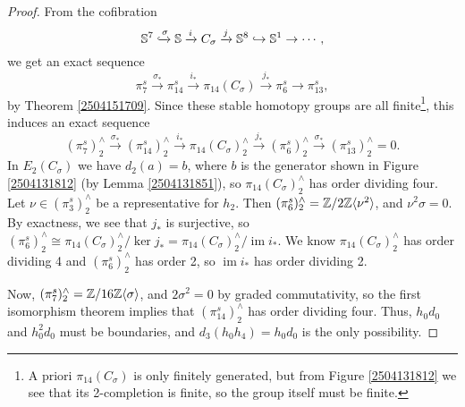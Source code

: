 \documentclass[11pt, titlepage]{article} %
\def\bb{\ensuremath\mathbb}
\def\inj{\ensuremath\hookrightarrow}
\def\xinj{\ensuremath\xhookrightarrow}
\def\inte{\ensuremath\mathbb{Z}}
\DeclareMathOperator{\im}{im}
\numberwithin{equation}{subsection}
\theoremstyle{plain}
\theoremstyle{definition}
\begin{document}
\begin{proof}
From the cofibration 
\[\bb{S}^7 \xinj{\sigma} \bb{S} \xrightarrow{i}C_\sigma \xrightarrow{j}\bb{S}^8 \inj \bb{S}^1 \to\cdots,\]
we get an exact sequence
\[\pi_{7}^s \xrightarrow{\sigma_*} \pi_{14}^s \xrightarrow{i_*} \pi_{14}(C_\sigma) \xrightarrow{j_*} \pi_6^s \to \pi_{13}^s,\]
by Theorem \ref{2504151709}. Since these stable homotopy groups are all finite\footnote{A priori \(\pi_{14}(C_\sigma)\) is only finitely generated, but from Figure \ref{2504131812} we see that its 2-completion is finite, so the group itself must be finite.}, this induces an exact sequence %
\[(\pi_{7}^s)^\wedge_2 \xrightarrow{\sigma_*} (\pi_{14}^s)^\wedge_2 \xrightarrow{i_*} \pi_{14}(C_\sigma)^\wedge_2 \xrightarrow{j_*} (\pi_6^s)^\wedge_2 \xrightarrow{\sigma_*} (\pi_{13}^s)^\wedge_2=0.\]
In \(E_2(C_\sigma)\) we have \(d_2(a)=b\), where \(b\) is the generator shown in Figure \ref{2504131812} (by Lemma \ref{2504131851}), so \(\pi_{14}(C_\sigma)^\wedge_2\) has order dividing four. Let \(\nu \in (\pi_3^s)^\wedge_2\) be a representative for \(h_2\). Then \((\pi_6^s)^\wedge_2=\inte/2\inte \ang{\nu^2}\), and \(\nu^2 \sigma=0\). By exactness, we see that \(j_*\) is surjective, so \((\pi_6^s)^\wedge_2\cong \pi_{14}(C_\sigma)^\wedge_2/\ker j_*=\pi_{14}(C_\sigma)^\wedge_2/\im i_*\). We know \(\pi_{14}(C_\sigma)^\wedge_2\) has order dividing 4 and \((\pi_6^s)^\wedge_2\) has order 2, so \(\im i_*\) has order dividing 2. 

Now, \((\pi_7^s)^\wedge_2=\inte/16\inte \ang{\sigma}\), and \(2 \sigma^2=0\) by graded commutativity, so the first isomorphism theorem implies that \((\pi_{14}^s)^\wedge_2\) has order dividing four. Thus, \(h_0d_0\) and \(h_0^2d_0\) must be boundaries, and \(d_3(h_0h_4)=h_0d_0\) is the only possibility.
\end{proof}

\end{document}

